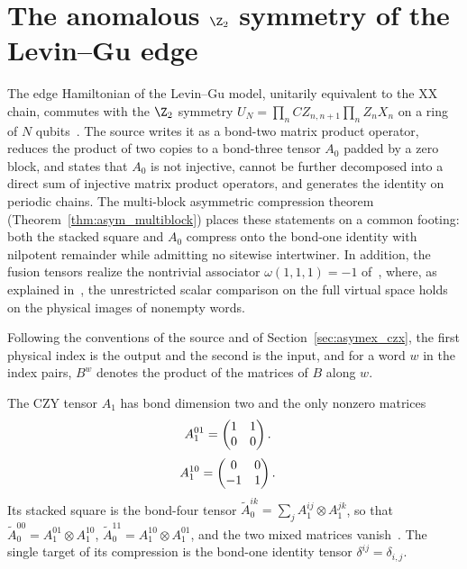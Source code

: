 \section{The anomalous \texorpdfstring{$\Z_2$}{Z2} symmetry of the Levin--Gu edge}%
\label{sec:asymex_czy}

The edge Hamiltonian of the Levin--Gu model, unitarily equivalent to the
XX chain, commutes with the $\Z_2$ symmetry
$U_N=\prod_nCZ_{n,n+1}\prod_nZ_nX_n$ on a ring of $N$
qubits~\cite[Section~II]{Liu2025Bialgebraic}. The source writes it as a
bond-two matrix product operator, reduces the product of two copies to a
bond-three tensor $A_0$ padded by a zero block, and states that $A_0$ is
not injective, cannot be further decomposed into a direct sum of
injective matrix product operators, and generates the identity on
periodic chains. The multi-block asymmetric compression theorem
(Theorem~\ref{thm:asym_multiblock}) places these statements on a common
footing: both the stacked square and $A_0$ compress onto the bond-one
identity with nilpotent remainder while admitting no sitewise
intertwiner. In addition, the fusion tensors realize the nontrivial
associator $\omega(1,1,1)=-1$ of~\cite[Section~II]{Liu2025Bialgebraic},
where, as explained in~\cite{gap:lmsvkl25_czy_associator}, the
unrestricted scalar comparison on the full virtual space holds on the
physical images of nonempty words.

Following the conventions of the source and of
Section~\ref{sec:asymex_czx}, the first physical index is the output and
the second is the input, and for a word $w$ in the index pairs, $B^w$
denotes the product of the matrices of $B$ along $w$.

\begin{definition}
    \label{def:asymex_czy_tensors}
    \leanok
    The CZY tensor $A_1$ has bond dimension two and the only nonzero
    matrices
    \begin{align}
        A_1^{01} & =\begin{pmatrix}1&1\\0&0\end{pmatrix}.
        \notag
    \end{align}
    \begin{align}
        A_1^{10} & =\begin{pmatrix}0&0\\-1&1\end{pmatrix}.
        \notag
    \end{align}
    Its stacked square is the bond-four tensor
    $\widetilde A_0^{ik}=\sum_jA_1^{ij}\otimes A_1^{jk}$, so that
    $\widetilde A_0^{00}=A_1^{01}\otimes A_1^{10}$,
    $\widetilde A_0^{11}=A_1^{10}\otimes A_1^{01}$, and the two mixed
    matrices vanish~\cite[Section~II]{Liu2025Bialgebraic}. The single
    target of its compression is the bond-one identity tensor
    $\delta^{ij}=\delta_{i,j}$.
\end{definition}

